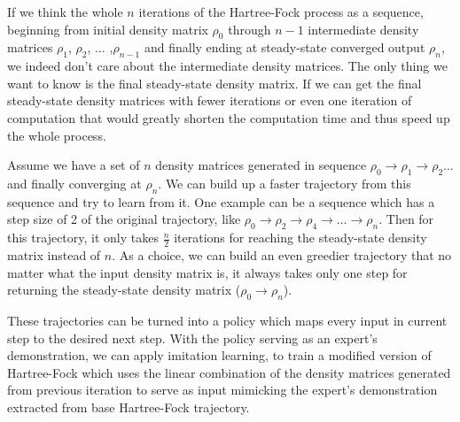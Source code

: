 \documentclass[twoside,11pt]{article}
\begin{document}



If we think the whole $n$ iterations of the Hartree-Fock process as a sequence, beginning from initial density matrix $\rho_0$ through $n-1$ intermediate density matrices $\rho_1$,  $\rho_2$,  $\ldots$ ,$\rho_{n-1}$ and finally ending at steady-state converged output $\rho_{n}$, we indeed don't care about the intermediate density matrices. The only thing we want to know is the final steady-state density matrix. If we can get the final steady-state density matrices with fewer iterations or even one iteration of computation that would greatly shorten the computation time and thus speed up the whole process. 



Assume we have a set of $n$ density matrices generated in sequence   $\rho_0 \rightarrow  \rho_1 \rightarrow  \rho_2  \ldots  $ and finally converging at $\rho_{n}$. 
We can build up a faster trajectory from this sequence and try to learn from it.
One example can be a sequence which has a step size of 2 of the original trajectory, like $\rho_0 \rightarrow \rho_2 \rightarrow  \rho_4 \rightarrow  \ldots \rightarrow  \rho_{n}$. Then for this trajectory, it only takes $\frac{n}{2}$ iterations for reaching the steady-state density matrix instead of $n$.
As a choice, we can build an even greedier trajectory that no matter what the input density matrix is, it always takes only one step for returning the steady-state density matrix ($\rho_0 \rightarrow \rho_{n}$).


These trajectories can be turned into a policy which maps every input in current step to the desired next step. With the policy serving as an expert's demonstration, we can apply imitation learning, to train a modified version of Hartree-Fock which uses the linear combination of the density matrices generated from previous iteration to serve as input mimicking the expert's demonstration extracted from base Hartree-Fock trajectory.
\end{document}
